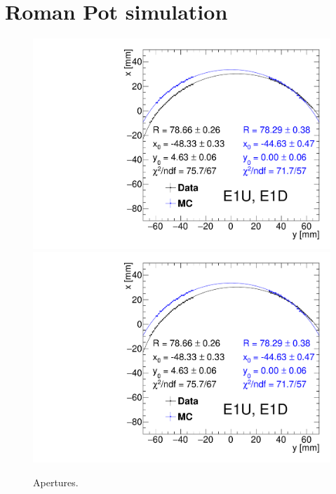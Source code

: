 

\chapter{Roman Pot simulation}\label{chap:romanPotSimulation}


\begin{figure}[hb]%
\caption[Apertures.]{Apertures.}\label{fig:aperturesWithFit}%
\centering
\parbox{0.495\textwidth}{
  \centering
  \includegraphics[width=\linewidth,page=1]{graphics/rpSim/Apertures_swapedAxes_withFit_beforeDxShift.pdf}\\
  \includegraphics[width=\linewidth,page=2]{graphics/rpSim/Apertures_swapedAxes_withFit_beforeDxShift.pdf}\\
}
\end{figure}

